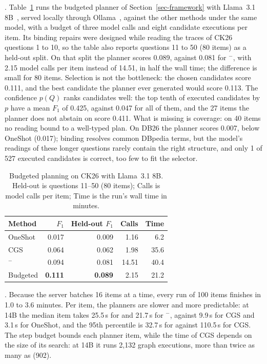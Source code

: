 .
Table~\ref{tab-budget} runs the budgeted planner of
Section~\ref{sec-framework} with Llama~3.1 8B~\cite{grattafiori2024llama3},
served locally through Ollama~\cite{ollama}, against the other methods
under the same model, with a budget of three model calls and eight
candidate executions per item.
Its binding repairs were designed while reading the traces of CK26
questions 1 to 10, so the table also reports questions 11 to 50 (80 items)
as a held-out split.
On that split the planner scores 0.089, against 0.081 for \hermes{}$^-$,
with 2.15 model calls per item instead of 14.51, in half the wall time;
the difference is small for 80 items.
Selection is not the bottleneck: the chosen candidates score 0.111, and
the best candidate the planner ever generated would score 0.113.
The confidence $p(Q)$ ranks candidates well: the top tenth of executed
candidates by $p$ have a mean $F_1$ of 0.425, against 0.047 for all of
them, and the 27 items the planner does not abstain on score 0.411.
What is missing is coverage: on 40 items no reading bound to a
well-typed plan.
On DB26 the planner scores 0.007, below OneShot (0.017); binding resolves
common DBpedia terms, but the model's readings of these longer questions
rarely contain the right structure, and only 1 of 527 executed
candidates is correct, too few to fit the selector.

\begin{table}[t]
  \caption{Budgeted planning on CK26 with Llama~3.1 8B. Held-out is
    questions 11--50 (80 items); Calls is model calls per item; Time is
    the run's wall time in minutes.}
  \label{tab-budget}
  \footnotesize
  \setlength{\tabcolsep}{4pt}
  \begin{tabular}{lrrrr}
    \toprule
    Method & $F_1$ & Held-out $F_1$ & Calls & Time \\
    \midrule
    OneShot & 0.017 & 0.009 & 1.16 & 6.2 \\
    CGS & 0.064 & 0.062 & 1.98 & 35.6 \\
    \hermes{}$^-$ & 0.094 & 0.081 & 14.51 & 40.4 \\
    \rowcolor{hermesbg} Budgeted & \textbf{0.111} & \textbf{0.089} & 2.15 & 21.2 \\
    \bottomrule
  \end{tabular}
\end{table}

.
Because the server batches 16 items at a time, every run of 100 items
finishes in 1.0 to 3.6 minutes.
Per item, the planners are slower and more predictable: at 14B the
median item takes 25.5\,s for \hermes and 21.7\,s for \hermes{}$^-$,
against 9.9\,s for CGS and 3.1\,s for OneShot, and the 95th percentile
is 32.7\,s for \hermes against 110.5\,s for CGS.
The step budget bounds each planner item, while the time of CGS depends
on the size of its search: at 14B it runs 2,132 graph executions,
more than twice as many as \hermes (902).

